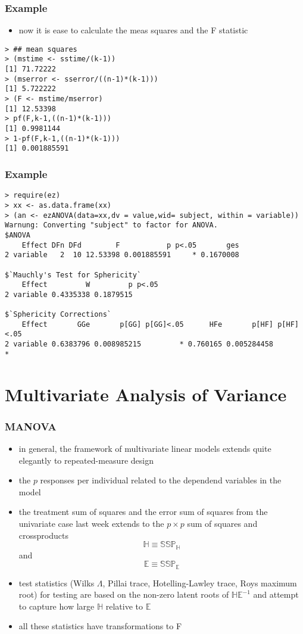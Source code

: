 \begin{frame}\frametitle{Example}
  \begin{itemize}
  \item now it is ease to calculate the meas squares and the F statistic
  \end{itemize}\scriptsize
\begin{verbatim}
> ## mean squares
> (mstime <- sstime/(k-1))
[1] 71.72222
> (mserror <- sserror/((n-1)*(k-1)))
[1] 5.722222
> (F <- mstime/mserror)
[1] 12.53398
> pf(F,k-1,((n-1)*(k-1)))
[1] 0.9981144
> 1-pf(F,k-1,((n-1)*(k-1)))
[1] 0.001885591
\end{verbatim}
\end{frame}

\begin{frame}\frametitle{Example}\scriptsize
\begin{verbatim}
> require(ez)
> xx <- as.data.frame(xx)
> (an <- ezANOVA(data=xx,dv = value,wid= subject, within = variable))
Warnung: Converting "subject" to factor for ANOVA.
$ANOVA
    Effect DFn DFd        F           p p<.05       ges
2 variable   2  10 12.53398 0.001885591     * 0.1670008

$`Mauchly's Test for Sphericity`
    Effect         W         p p<.05
2 variable 0.4335338 0.1879515      

$`Sphericity Corrections`
    Effect       GGe       p[GG] p[GG]<.05      HFe       p[HF] p[HF]<.05
2 variable 0.6383796 0.008985215         * 0.760165 0.005284458         *
\end{verbatim}
\end{frame}


\section{Multivariate Analysis of Variance}
\begin{frame}\frametitle{MANOVA}
  \begin{itemize}
  \item in general, the framework of multivariate linear models extends quite elegantly to repeated-measure design
  \item the $p$ responses per individual related to the dependend variables in the model
  \item the treatment sum of squares and the error sum of squares from the univariate case last week extends to the $p \times p$ sum of squares and crossproducts
$$ \mathbb{H}\equiv \mathbb{SSP_{H}}$$ and $$ \mathbb{E}\equiv \mathbb{SSP_{E}}$$
  \item test statistics (Wilks $\Lambda$, Pillai trace, Hotelling-Lawley trace, Roys maximum root) for testing are based on the non-zero latent roots of $\mathbb{HE}^{-1}$ and attempt to capture how large $\mathbb{H}$ relative to $\mathbb{E}$
  \item all these statistics have transformations to F 
  \end{itemize}
\end{frame}


